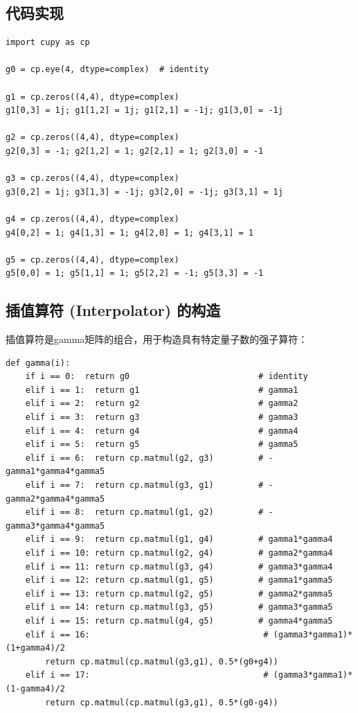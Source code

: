 \documentclass[12pt,a4paper]{ctexart}
\begin{document}
\subsection{代码实现}

\begin{codebox}
\begin{lstlisting}[style=pythonstyle]
import cupy as cp

g0 = cp.eye(4, dtype=complex)  # identity

g1 = cp.zeros((4,4), dtype=complex)
g1[0,3] = 1j; g1[1,2] = 1j; g1[2,1] = -1j; g1[3,0] = -1j

g2 = cp.zeros((4,4), dtype=complex)
g2[0,3] = -1; g2[1,2] = 1; g2[2,1] = 1; g2[3,0] = -1

g3 = cp.zeros((4,4), dtype=complex)
g3[0,2] = 1j; g3[1,3] = -1j; g3[2,0] = -1j; g3[3,1] = 1j

g4 = cp.zeros((4,4), dtype=complex)
g4[0,2] = 1; g4[1,3] = 1; g4[2,0] = 1; g4[3,1] = 1

g5 = cp.zeros((4,4), dtype=complex)
g5[0,0] = 1; g5[1,1] = 1; g5[2,2] = -1; g5[3,3] = -1
\end{lstlisting}
\end{codebox}

\subsection{插值算符 (Interpolator) 的构造}

插值算符是gamma矩阵的组合，用于构造具有特定量子数的强子算符：

\begin{codebox}
\begin{lstlisting}[style=pythonstyle]
def gamma(i):
    if i == 0:  return g0                          # identity
    elif i == 1:  return g1                        # gamma1
    elif i == 2:  return g2                        # gamma2
    elif i == 3:  return g3                        # gamma3
    elif i == 4:  return g4                        # gamma4
    elif i == 5:  return g5                        # gamma5
    elif i == 6:  return cp.matmul(g2, g3)         # -gamma1*gamma4*gamma5
    elif i == 7:  return cp.matmul(g3, g1)         # -gamma2*gamma4*gamma5
    elif i == 8:  return cp.matmul(g1, g2)         # -gamma3*gamma4*gamma5
    elif i == 9:  return cp.matmul(g1, g4)         # gamma1*gamma4
    elif i == 10: return cp.matmul(g2, g4)         # gamma2*gamma4
    elif i == 11: return cp.matmul(g3, g4)         # gamma3*gamma4
    elif i == 12: return cp.matmul(g1, g5)         # gamma1*gamma5
    elif i == 13: return cp.matmul(g2, g5)         # gamma2*gamma5
    elif i == 14: return cp.matmul(g3, g5)         # gamma3*gamma5
    elif i == 15: return cp.matmul(g4, g5)         # gamma4*gamma5
    elif i == 16:                                   # (gamma3*gamma1)*(1+gamma4)/2
        return cp.matmul(cp.matmul(g3,g1), 0.5*(g0+g4))
    elif i == 17:                                   # (gamma3*gamma1)*(1-gamma4)/2
        return cp.matmul(cp.matmul(g3,g1), 0.5*(g0-g4))
\end{lstlisting}
\end{codebox}
\end{document}
